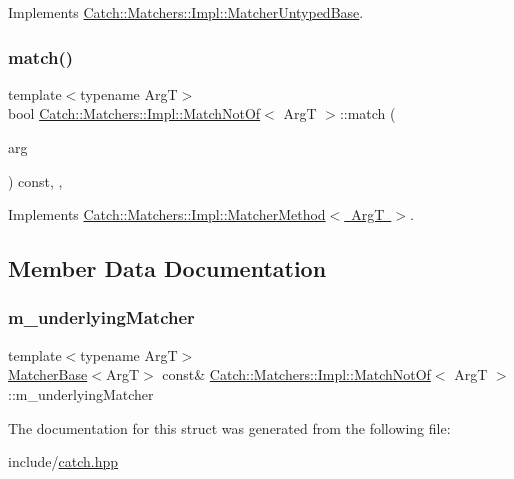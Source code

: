 Implements \mbox{\hyperlink{classCatch_1_1Matchers_1_1Impl_1_1MatcherUntypedBase_a91d3a907dbfcbb596077df24f6e11fe2}{Catch\+::\+Matchers\+::\+Impl\+::\+Matcher\+Untyped\+Base}}.

\mbox{\label{structCatch_1_1Matchers_1_1Impl_1_1MatchNotOf_a181d693c0258e582d80dc6117a1f2b66}} 
\subsubsection{\texorpdfstring{match()}{match()}}
{\footnotesize\ttfamily template$<$typename ArgT$>$ \\
bool \mbox{\hyperlink{structCatch_1_1Matchers_1_1Impl_1_1MatchNotOf}{Catch\+::\+Matchers\+::\+Impl\+::\+Match\+Not\+Of}}$<$ ArgT $>$\+::match (\begin{DoxyParamCaption}\item[{ArgT const \&}]{arg }\end{DoxyParamCaption}) const\hspace{0.3cm}{\ttfamily [inline]}, {\ttfamily [override]}, {\ttfamily [virtual]}}



Implements \mbox{\hyperlink{structCatch_1_1Matchers_1_1Impl_1_1MatcherMethod_ae0920ff9e817acf08e1bb0cbcb044e30}{Catch\+::\+Matchers\+::\+Impl\+::\+Matcher\+Method$<$ Arg\+T $>$}}.



\subsection{Member Data Documentation}
\mbox{\label{structCatch_1_1Matchers_1_1Impl_1_1MatchNotOf_af7ac67f112b0e93796b048a47329aad4}} 
\subsubsection{\texorpdfstring{m\+\_\+underlying\+Matcher}{m\_underlyingMatcher}}
{\footnotesize\ttfamily template$<$typename ArgT$>$ \\
\mbox{\hyperlink{structCatch_1_1Matchers_1_1Impl_1_1MatcherBase}{Matcher\+Base}}$<$ArgT$>$ const\& \mbox{\hyperlink{structCatch_1_1Matchers_1_1Impl_1_1MatchNotOf}{Catch\+::\+Matchers\+::\+Impl\+::\+Match\+Not\+Of}}$<$ ArgT $>$\+::m\+\_\+underlying\+Matcher}



The documentation for this struct was generated from the following file\+:\begin{DoxyCompactItemize}
\item 
include/\mbox{\hyperlink{catch_8hpp}{catch.\+hpp}}\end{DoxyCompactItemize}
